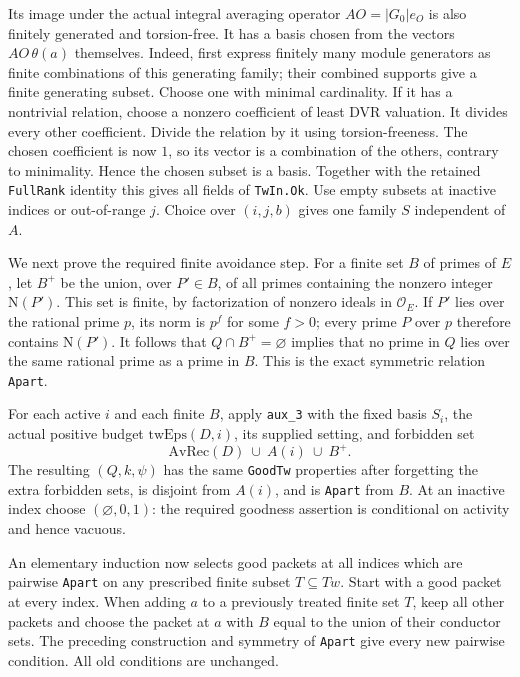 Its image under the actual integral averaging operator
$AO=|G_0|e_O$ is also finitely generated and torsion-free.
It has a basis chosen from the vectors $AO\,\theta(a)$ themselves.
Indeed, first express finitely many module generators as finite
combinations of this generating family; their combined supports give
a finite generating subset. Choose one with minimal cardinality.
If it has a nontrivial relation, choose a nonzero coefficient of
least DVR valuation. It divides every other coefficient. Divide the
relation by it using torsion-freeness. The chosen coefficient is now
$1$, so its vector is a combination of the others, contrary to
minimality. Hence the chosen subset is a basis. Together with the
retained \texttt{FullRank} identity this gives all fields of
\texttt{TwIn.Ok}. Use empty subsets at inactive indices or out-of-range
$j$. Choice over $(i,j,b)$ gives one family $S$ independent of $A$.

We next prove the required finite avoidance step. For a finite set
$B$ of primes of $E$, let $B^+$ be the union, over $P'\in B$,
of all primes containing the nonzero integer $\mathrm N(P')$.
This set is finite, by factorization of nonzero ideals in
$\mathcal O_E$. If $P'$ lies over the rational prime $p$, its norm is
$p^f$ for some $f>0$; every prime $P$ over $p$ therefore contains
$\mathrm N(P')$. It follows that $Q\cap B^+=\varnothing$ implies
that no prime in $Q$ lies over the same rational prime as a prime in
$B$. This is the exact symmetric relation \texttt{Apart}.

For each active $i$ and each finite $B$, apply \texttt{aux\_3}
with the fixed basis $S_i$, the actual positive budget
$\mathrm{twEps}(D,i)$, its supplied setting, and forbidden set
\[
             \mathrm{AvRec}(D)\ \cup\ A(i)\ \cup\ B^+ .
                                                               \tag{RC.24}
\]
The resulting $(Q,k,\psi)$ has the same \texttt{GoodTw} properties
after forgetting the extra forbidden sets, is disjoint from $A(i)$,
and is \texttt{Apart} from $B$.
At an inactive index choose $(\varnothing,0,1)$: the required
goodness assertion is conditional on activity and hence vacuous.

An elementary induction now selects good packets at all indices
which are pairwise \texttt{Apart} on any prescribed finite subset
$T\subseteq Tw$. Start with a good packet at every index.
When adding $a$ to a previously treated finite set $T$, keep all
other packets and choose the packet at $a$ with $B$ equal to the
union of their conductor sets. The preceding construction and
symmetry of \texttt{Apart} give every new pairwise condition.
All old conditions are unchanged.

